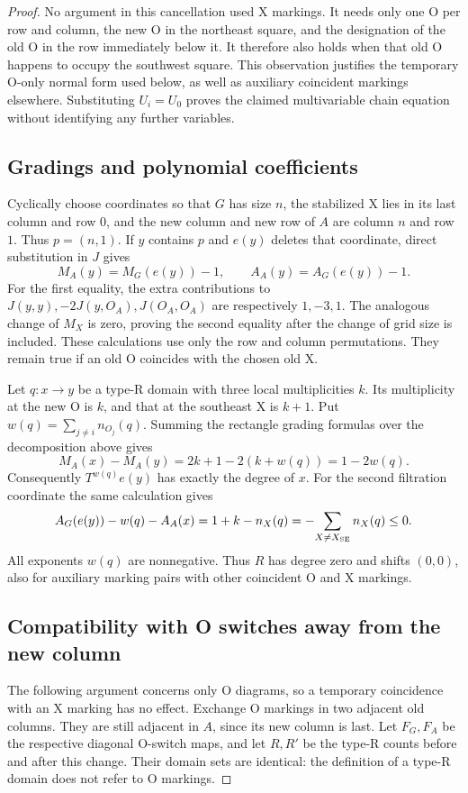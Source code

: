 \documentclass[11pt,a4paper]{article}
\theoremstyle{remark}
\begin{document}
\begin{proof}
No argument in this cancellation used X markings.  It needs only
one O per row and column, the new O in the northeast square, and
the designation of the old O in the row immediately below it.
It therefore also holds when that old O happens to occupy the
southwest square.  This observation justifies the temporary O-only
normal form used below, as well as auxiliary coincident markings
elsewhere.  Substituting $U_i=U_0$ proves the claimed multivariable
chain equation without identifying any further variables.

\subsection{Gradings and polynomial coefficients}

Cyclically choose coordinates so that $G$ has size $n$, the stabilized
X lies in its last column and row $0$, and the new column and new row
of $A$ are column $n$ and row $1$.  Thus $p=(n,1)$.  If $y$ contains
$p$ and $e(y)$ deletes that coordinate, direct substitution in $J$ gives
\[
 M_A(y)=M_G(e(y))-1,\qquad A_A(y)=A_G(e(y))-1.
\]
For the first equality, the extra contributions to
$J(y,y),-2J(y,O_A),J(O_A,O_A)$ are respectively $1,-3,1$.
The analogous change of $M_X$ is zero, proving the second equality
after the change of grid size is included.  These calculations use
only the row and column permutations.  They remain true if an old
O coincides with the chosen old X.

Let $q:x\to y$ be a type-R domain with three local multiplicities $k$.
Its multiplicity at the new O is $k$, and that at the southeast X is
$k+1$.  Put $w(q)=\sum_{j\ne i}n_{O_j}(q)$.  Summing the rectangle
grading formulas over the decomposition above gives
\[
 M_A(x)-M_A(y)=2k+1-2(k+w(q))=1-2w(q).
\]
Consequently $T^{w(q)}e(y)$ has exactly the degree of $x$.  For the
second filtration coordinate the same calculation gives
\[
 A_G(e(y))-w(q)-A_A(x)
   =1+k-n_X(q)
   =-\!\sum_{X\ne X_{\rm SE}}n_X(q)\le0.
\]
All exponents $w(q)$ are nonnegative.  Thus $R$ has degree zero and
shifts $(0,0)$, also for auxiliary marking pairs with other coincident
O and X markings.

\subsection{Compatibility with O switches away from the new column}

The following argument concerns only O diagrams, so a temporary
coincidence with an X marking has no effect.  Exchange O markings in
two adjacent old columns.  They are still adjacent in $A$, since its
new column is last.  Let $F_G,F_A$ be the respective diagonal O-switch
maps, and let $R,R'$ be the type-R counts before and after this change.
Their domain sets are identical: the definition of a type-R domain
does not refer to O markings.


\end{proof}
\end{document}
